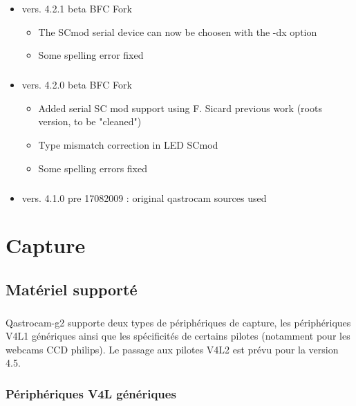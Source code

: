\documentclass[11pt,a4paper]{book}
\begin{document}
\begin{itemize}
\paragraph*{}
\item vers. 4.2.1 beta BFC Fork
\begin{itemize}
\item The SCmod serial device can now be choosen with the -dx option
\item Some spelling error fixed
\end{itemize}
\paragraph*{}
\item vers. 4.2.0 beta BFC Fork
\begin{itemize}
\item Added serial SC mod support using F. Sicard previous work (roots version, to be "cleaned")
\item Type mismatch correction in LED SCmod
\item Some spelling errors fixed
\end{itemize}
\paragraph*{}  
\item vers. 4.1.0 pre 17082009 : original qastrocam sources used
\end{itemize}

\chapter{Capture}

\section{Mat\'eriel support\'e}

\paragraph*{}
Qastrocam-g2 supporte deux types de p\'eriph\'eriques de capture, les p\'eriph\'eriques V4L1 
g\'en\'eriques ainsi que les sp\'ecificit\'es de certains pilotes (notamment pour les webcams
CCD philips). Le passage aux pilotes V4L2 est pr\'evu pour la version 4.5.

\subsection{P\'eriph\'eriques V4L g\'en\'eriques}
\end{document}
